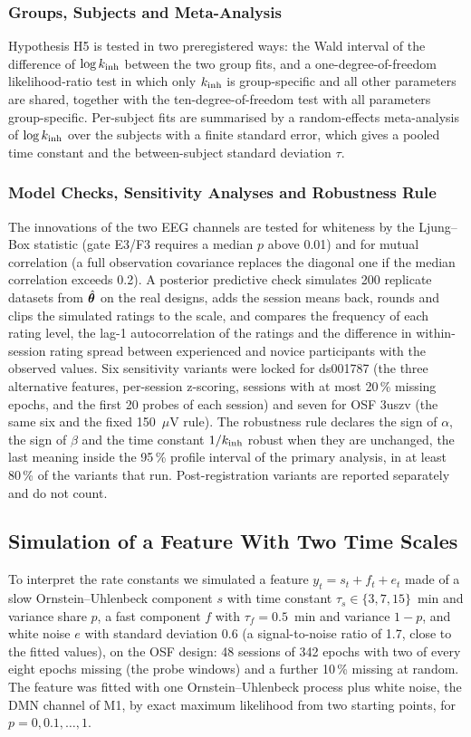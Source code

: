 \subsubsection{Groups, Subjects and Meta-Analysis}
Hypothesis H5 is tested in two preregistered ways: the Wald interval of the difference of $\log k_{\mathrm{inh}}$ between the two group fits, and a one-degree-of-freedom likelihood-ratio test in which only $k_{\mathrm{inh}}$ is group-specific and all other parameters are shared, together with the ten-degree-of-freedom test with all parameters group-specific. Per-subject fits are summarised by a random-effects meta-analysis of $\log k_{\mathrm{inh}}$ \cite{Viechtbauer2005} over the subjects with a finite standard error, which gives a pooled time constant and the between-subject standard deviation $\tau$.

\subsubsection{Model Checks, Sensitivity Analyses and Robustness Rule}
The innovations of the two EEG channels are tested for whiteness by the Ljung--Box statistic \cite{Ljung1978} (gate E3/F3 requires a median $p$ above 0.01) and for mutual correlation (a full observation covariance replaces the diagonal one if the median correlation exceeds 0.2). A posterior predictive check \cite{Gelman1996} simulates 200 replicate datasets from $\hat{\boldsymbol{\theta}}$ on the real designs, adds the session means back, rounds and clips the simulated ratings to the scale, and compares the frequency of each rating level, the lag-1 autocorrelation of the ratings and the difference in within-session rating spread between experienced and novice participants with the observed values. Six sensitivity variants were locked for ds001787 (the three alternative features, per-session z-scoring, sessions with at most 20\,\% missing epochs, and the first 20 probes of each session) and seven for OSF 3uszv (the same six and the fixed 150~$\mu$V rule). The robustness rule declares the sign of $\alpha$, the sign of $\beta$ and the time constant $1/k_{\mathrm{inh}}$ robust when they are unchanged, the last meaning inside the 95\,\% profile interval of the primary analysis, in at least 80\,\% of the variants that run. Post-registration variants are reported separately and do not count.

\subsection{Simulation of a Feature With Two Time Scales}
\label{sec:simmethods}
To interpret the rate constants we simulated a feature $y_t=s_t+f_t+e_t$ made of a slow Ornstein--Uhlenbeck component $s$ with time constant $\tau_s\in\{3,7,15\}$~min and variance share $p$, a fast component $f$ with $\tau_f=0.5$~min and variance $1-p$, and white noise $e$ with standard deviation 0.6 (a signal-to-noise ratio of 1.7, close to the fitted values), on the OSF design: 48 sessions of 342 epochs with two of every eight epochs missing (the probe windows) and a further 10\,\% missing at random. The feature was fitted with one Ornstein--Uhlenbeck process plus white noise, the DMN channel of M1, by exact maximum likelihood from two starting points, for $p=0,0.1,\dots,1$.

